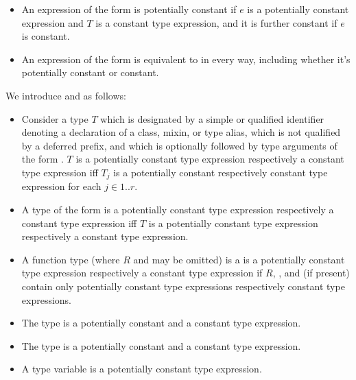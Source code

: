\documentclass[makeidx]{article}
\begin{document}
{\begin{itemize}
  if $e$ is a potentially constant expression
  and $T$ is a potentially constant type expression,
  and it is further constant if $e$ is constant.
\item
  An expression of the form  is potentially constant
  if $e$ is a potentially constant expression
  and $T$ is a constant type expression,
  and it is further constant if $e$ is constant.
\item
  An expression of the form 
  is equivalent to  in every way,
  including whether it's potentially constant or constant.
\end{itemize}

\LMHash{}%
We introduce  and
as follows:
\begin{itemize}
\item
  Consider a type $T$
  which is designated by a simple or qualified identifier
  denoting a declaration of a class, mixin, or type alias,
  which is not qualified by a deferred prefix,
  and which is optionally followed by
  type arguments of the form .
  $T$ is a potentially constant type expression
  respectively a constant type expression
  if{}f $T_j$ is a potentially constant respectively constant type expression
  for each $j \in 1 .. r$.
\item
  A type of the form 
  is a potentially constant type expression
  respectively a constant type expression
  if{}f $T$ is a potentially constant type expression
  respectively a constant type expression.
\item
  A function type
  (where $R$ and  may be omitted)
  is a is a potentially constant type expression
  respectively a constant type expression
  if $R$, , and 
  (if present) contain only potentially constant type expressions
  respectively constant type expressions.
\item
  The type \VOID{} is a potentially constant and a constant type expression.
\item
  The type \DYNAMIC{} is a potentially constant and a constant type expression.
\item
  A type variable is a potentially constant type expression.
\end{itemize}

}
\end{document}
